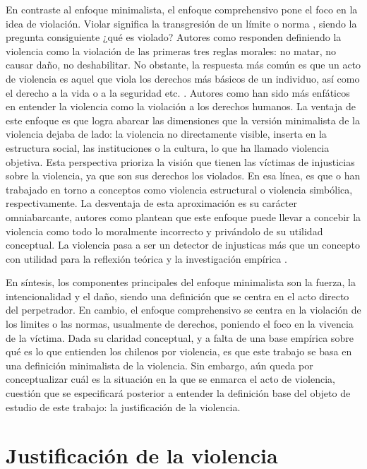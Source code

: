 \documentclass[12pt,twoside]{templates/facsothesis}
\begin{document}
En contraste al enfoque minimalista, el enfoque comprehensivo pone el foco en la idea de violación. Violar significa la transgresión de un límite o norma \citep{Bufacchi2005, Bufacchi2007}, siendo la pregunta consiguiente ¿qué es violado? Autores como \citet{Gerd1969} responden definiendo la violencia como la violación de las primeras tres reglas morales: no matar, no causar daño, no deshabilitar. No obstante, la respuesta más común es que un acto de violencia es aquel que viola los derechos más básicos de un individuo, así como el derecho a la vida o a la seguridad etc. \citep{Copoeru2020}. Autores como \citet{Demirbas2019} han sido más enfáticos en entender la violencia como la violación a los derechos humanos. La ventaja de este enfoque es que logra abarcar las dimensiones que la versión minimalista de la violencia dejaba de lado: la violencia no directamente visible, inserta en la estructura social, las instituciones o la cultura, lo que \citet{Zizek2008} ha llamado violencia objetiva. Esta perspectiva prioriza la visión que tienen las víctimas de injusticias sobre la violencia, ya que son sus derechos los violados. En esa línea, es que \citet{Galtung1969} o \citet{Bourdieu1991} han trabajado en torno a conceptos como violencia estructural o violencia simbólica, respectivamente. La desventaja de esta aproximación es su carácter omniabarcante, autores como \citet{Bufacchi2005} plantean que este enfoque puede llevar a concebir la violencia como todo lo moralmente incorrecto y privándolo de su utilidad conceptual. La violencia pasa a ser un detector de injusticas más que un concepto con utilidad para la reflexión teórica y la investigación empírica \citep{Arostegui1994}.

En síntesis, los componentes principales del enfoque minimalista son la fuerza, la intencionalidad y el daño, siendo una definición que se centra en el acto directo del perpetrador. En cambio, el enfoque comprehensivo se centra en la violación de los limites o las normas, usualmente de derechos, poniendo el foco en la vivencia de la víctima. Dada su claridad conceptual, y a falta de una base empírica sobre qué es lo que entienden los chilenos por violencia, es que este trabajo se basa en una definición minimalista de la violencia. Sin embargo, aún queda por conceptualizar cuál es la situación en la que se enmarca el acto de violencia, cuestión que se especificará posterior a entender la definición base del objeto de estudio de este trabajo: la justificación de la violencia.

\hypertarget{justificaciuxf3n-de-la-violencia}{%
\section{Justificación de la violencia}\label{justificaciuxf3n-de-la-violencia}}
\end{document}
